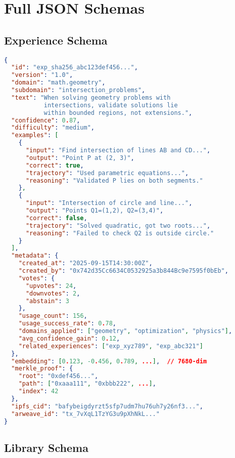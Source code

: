 \documentclass[11pt,letterpaper]{article}
\begin{document}
\appendix

\section{Full JSON Schemas}

\subsection{Experience Schema}

\begin{lstlisting}[language=json,caption=Complete Experience JSON]
{
  "id": "exp_sha256_abc123def456...",
  "version": "1.0",
  "domain": "math.geometry",
  "subdomain": "intersection_problems",
  "text": "When solving geometry problems with 
           intersections, validate solutions lie 
           within bounded regions, not extensions.",
  "confidence": 0.87,
  "difficulty": "medium",
  "examples": [
    {
      "input": "Find intersection of lines AB and CD...",
      "output": "Point P at (2, 3)",
      "correct": true,
      "trajectory": "Used parametric equations...",
      "reasoning": "Validated P lies on both segments."
    },
    {
      "input": "Intersection of circle and line...",
      "output": "Points Q1=(1,2), Q2=(3,4)",
      "correct": false,
      "trajectory": "Solved quadratic, got two roots...",
      "reasoning": "Failed to check Q2 is outside circle."
    }
  ],
  "metadata": {
    "created_at": "2025-09-15T14:30:00Z",
    "created_by": "0x742d35Cc6634C0532925a3b844Bc9e7595f0bEb",
    "votes": {
      "upvotes": 24,
      "downvotes": 2,
      "abstain": 3
    },
    "usage_count": 156,
    "usage_success_rate": 0.78,
    "domains_applied": ["geometry", "optimization", "physics"],
    "avg_confidence_gain": 0.12,
    "related_experiences": ["exp_xyz789", "exp_abc321"]
  },
  "embedding": [0.123, -0.456, 0.789, ...],  // 7680-dim
  "merkle_proof": {
    "root": "0xdef456...",
    "path": ["0xaaa111", "0xbbb222", ...],
    "index": 42
  },
  "ipfs_cid": "bafybeigdyrzt5sfp7udm7hu76uh7y26nf3...",
  "arweave_id": "tx_7vXqL1TzYG3u9pXhNkL..."
}
\end{lstlisting}

\subsection{Library Schema}
\end{document}
